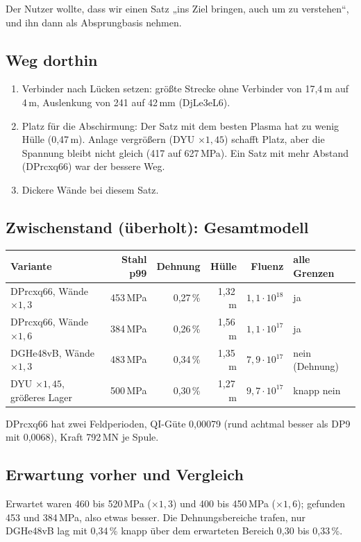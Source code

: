 Der Nutzer wollte, dass wir einen Satz „ins Ziel bringen, auch um zu verstehen“, und ihn dann als Absprungbasis nehmen.

\subsection*{Weg dorthin}
\begin{enumerate}\itemsep1pt
\item Verbinder nach Lücken setzen: größte Strecke ohne Verbinder von 17,4\,m auf 4\,m, Auslenkung von 241 auf 42\,mm (DjLe3eL6).
\item Platz für die Abschirmung: Der Satz mit dem besten Plasma hat zu wenig Hülle (0,47\,m). Anlage vergrößern (DYU $\times1{,}45$) schafft Platz, aber die Spannung
  bleibt nicht gleich (417 auf 627\,MPa). Ein Satz mit mehr Abstand (DPrcxq66) war der bessere Weg.
\item Dickere Wände bei diesem Satz.
\end{enumerate}

\subsection*{Zwischenstand (überholt): Gesamtmodell}
\begin{tabular}{lrrrrl}
\hline
Variante & Stahl p99 & Dehnung & Hülle & Fluenz & alle Grenzen \\ \hline
DPrcxq66, Wände $\times1{,}3$ & 453\,MPa & 0,27\,\% & 1,32\,m & $1{,}1\cdot10^{18}$ & ja \\
DPrcxq66, Wände $\times1{,}6$ & 384\,MPa & 0,26\,\% & 1,56\,m & $1{,}1\cdot10^{17}$ & ja \\
DGHe48vB, Wände $\times1{,}3$ & 483\,MPa & 0,34\,\% & 1,35\,m & $7{,}9\cdot10^{17}$ & nein (Dehnung) \\
DYU $\times1{,}45$, größeres Lager & 500\,MPa & 0,30\,\% & 1,27\,m & $9{,}7\cdot10^{17}$ & knapp nein \\ \hline
\end{tabular}

\smallskip
\noindent DPrcxq66 hat zwei Feldperioden, QI-Güte 0,00079 (rund achtmal besser als DP9 mit 0,0068), Kraft 792\,MN je Spule.

\subsection*{Erwartung vorher und Vergleich}
Erwartet waren 460 bis 520\,MPa ($\times1{,}3$) und 400 bis 450\,MPa ($\times1{,}6$); gefunden 453 und 384\,MPa, also etwas besser. Die Dehnungsbereiche trafen,
nur DGHe48vB lag mit 0,34\,\% knapp über dem erwarteten Bereich 0,30 bis 0,33\,\%.

